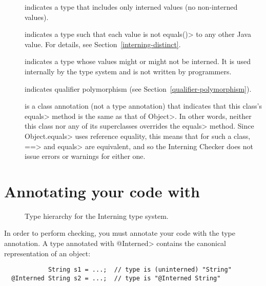 \begin{description}

\item[]
  indicates a type that includes only interned values (no non-interned
  values).

\item[]
  indicates a type such that each value is not \<equals()> to any other
  Java value.  For details, see Section~\ref{interning-distinct}.

\item[]
  indicates a type whose values might or might not be interned.
  It is used internally by the type system and is not written by programmers.

\item[]
  indicates qualifier polymorphism (see
  Section~\ref{qualifier-polymorphism}).

\item[]
  is a class annotation (not a type annotation) that indicates that this class's
  \<equals> method is the same as that of \<Object>.  In other words,
  neither this class nor any of its superclasses overrides the \<equals>
  method.  Since \<Object.equals> uses reference equality, this means that
  for such a class, \<==> and \<equals> are equivalent, and so the
  Interning Checker does not issue errors or warnings for either one.

\end{description}


\section{Annotating your code with \label{interning-annotating}}

\begin{figure}
\caption{Type hierarchy for the Interning type system.}
\label{fig-interning-hierarchy}
\end{figure}

In order to perform checking, you must annotate your code with the 
type annotation.  A type annotated with \<@Interned> contains the canonical
representation of an
object:

\begin{smaller}
\begin{Verbatim}
            String s1 = ...;  // type is (uninterned) "String"
  @Interned String s2 = ...;  // type is "@Interned String"
\end{Verbatim}
\end{smaller}


